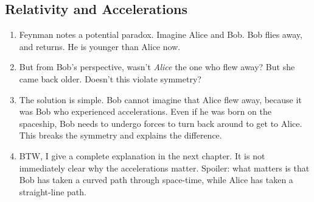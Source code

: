 \subsection{Relativity and Accelerations}

\begin{enumerate}

  \item Feynman notes a potential paradox. Imagine Alice and Bob. Bob
  flies away, and returns. He is younger than Alice now.

  \item But from Bob's perspective, wasn't \emph{Alice} the one who flew
  away? But she came back older. Doesn't this violate symmetry?

  \item The solution is simple. Bob cannot imagine that Alice flew away,
  because it was Bob who experienced accelerations. Even if he was born
  on the spaceship, Bob needs to undergo forces to turn back around to
  get to Alice. This breaks the symmetry and explains the difference.

  \item BTW, I give a complete explanation in the next chapter. It is
  not immediately clear why the accelerations matter. Spoiler: what
  matters is that Bob has taken a curved path through space-time, while
  Alice has taken a straight-line path.

\end{enumerate}
